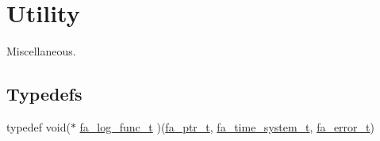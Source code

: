 \hypertarget{group___fa_utility}{\section{Utility}
\label{group___fa_utility}
}


Miscellaneous.  


\subsection*{Typedefs}
\begin{DoxyCompactItemize}
\item 
typedef void($\ast$ \hyperlink{group___fa_utility_ga1f914d0c16f566e96a08db3a3446aab7}{fa\-\_\-log\-\_\-func\-\_\-t} )(\hyperlink{group___fa_ga915ddeae99ad7568b273d2b876425197}{fa\-\_\-ptr\-\_\-t}, \hyperlink{group___fa_time_ga7dd7e28574eec80380aac22be7087d2e}{fa\-\_\-time\-\_\-system\-\_\-t}, \hyperlink{group___fa_error_ga4a4feb4d3686657ac8dbd2be421cbb15}{fa\-\_\-error\-\_\-t})
\end{DoxyCompactItemize}
